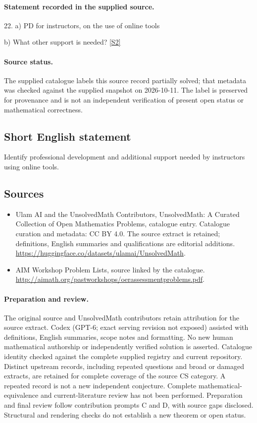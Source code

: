 \documentclass[11pt]{article}
\newcommand{\sref}[2]{\hyperlink{source:#1:#2}{[S#2]}}
\begin{document}
\paragraph{Statement recorded in the supplied source.}
22. a) PD for instructors, on the use of online tools

b) What other support is needed? \sref{statement}{2}
\paragraph{Source status.}
The supplied catalogue labels this source record partially solved; that metadata was checked against the supplied snapshot on 2026-10-11. The label is preserved for provenance and is not an independent verification of present open status or mathematical correctness.
\subsection{Short English statement}
Identify professional development and additional support needed by instructors using online tools.
\subsection{Sources}
\begin{itemize}
\item[\hypertarget{source:statement:1}{S1}] Ulam AI and the UnsolvedMath Contributors, UnsolvedMath: A Curated Collection of Open Mathematics Problems, catalogue entry. Catalogue curation and metadata: CC BY 4.0. The source extract is retained; definitions, English summaries and qualifications are editorial additions.
\url{https://huggingface.co/datasets/ulamai/UnsolvedMath}.
\item[\hypertarget{source:statement:2}{S2}] AIM Workshop Problem Lists, source linked by the catalogue.
\url{http://aimath.org/pastworkshops/oerassessmentproblems.pdf}.
\end{itemize}
\paragraph{Preparation and review.}
The original source and UnsolvedMath contributors retain attribution for the source extract. Codex (GPT-6; exact serving revision not exposed) assisted with definitions, English summaries, scope notes and formatting. No new human mathematical authorship or independently verified solution is asserted. Catalogue identity checked against the complete supplied registry and current repository. Distinct upstream records, including repeated questions and broad or damaged extracts, are retained for complete coverage of the source CS category. A repeated record is not a new independent conjecture. Complete mathematical-equivalence and current-literature review has not been performed. Preparation and final review follow contribution prompts C and D, with source gaps disclosed. Structural and rendering checks do not establish a new theorem or open status.
\label{end:statement}
\end{document}
